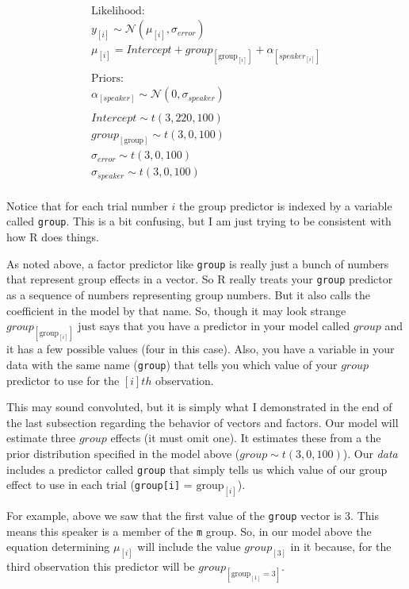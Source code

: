 \documentclass[
]{book}
\begin{document}
\begin{equation}
\begin{split}
\textrm{Likelihood:} \\
y_{[i]} \sim \mathcal{N}(\mu_{[i]},\sigma_{error}) \\
\mu_{[i]} = Intercept + group_{[\mathrm{group}_{[i]}]} + \alpha_{[speaker_{[i]}]} \\\\
\textrm{Priors:} \\
\alpha_{[speaker]} \sim \mathcal{N}(0,\sigma_{speaker}) \\ \\ 
Intercept \sim t(3, 220, 100) \\ 
group_{[\mathrm{group}]} \sim t(3, 0, 100) \\ 
\sigma_{error} \sim t(3, 0, 100) \\
\sigma_{speaker} \sim t(3, 0, 100) \\ 
\end{split}
\label{eq:41}
\end{equation}

Notice that for each trial number \(i\) the group predictor is indexed by a variable called \texttt{group}. This is a bit confusing, but I am just trying to be consistent with how R does things.

As noted above, a factor predictor like \texttt{group} is really just a bunch of numbers that represent group effects in a vector. So R really treats your \texttt{group} predictor as a sequence of numbers representing group numbers. But it also calls the coefficient in the model by that name. So, though it may look strange \(group_{[\mathrm{group}_{[i]}]}\) just says that you have a predictor in your model called \(group\) and it has a few possible values (four in this case). Also, you have a variable in your data with the same name (\texttt{group}) that tells you which value of your \(group\) predictor to use for the \([i]th\) observation.

This may sound convoluted, but it is simply what I demonstrated in the end of the last subsection regarding the behavior of vectors and factors. Our model will estimate three \(group\) effects (it must omit one). It estimates these from a the prior distribution specified in the model above (\(group \sim t(3, 0, 100)\)). Our \emph{data} includes a predictor called \texttt{group} that simply tells us which value of our group effect to use in each trial (\texttt{group{[}i{]}} = \(\mathrm{group}_{[i]}\)).

For example, above we saw that the first value of the \texttt{group} vector is 3. This means this speaker is a member of the \texttt{m} group. So, in our model above the equation determining \(\mu_{[i]}\) will include the value \(group_{[3]}\) in it because, for the third observation this predictor will be \(group_{[\mathrm{group}_{[1]}=3]}\).
\end{document}
